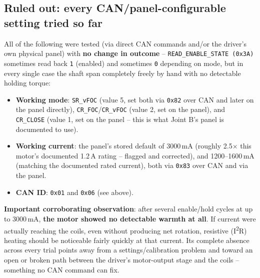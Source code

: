 \documentclass[11pt,letterpaper]{article}
\begin{document}
\subsection{Ruled out: every CAN/panel-configurable setting tried so far}
All of the following were tested (via direct CAN commands and/or the driver's own physical panel) with \textbf{no change in outcome} -- \texttt{READ\_ENABLE\_STATE (0x3A)} sometimes read back \texttt{1} (enabled) and sometimes \texttt{0} depending on mode, but in every single case the shaft span completely freely by hand with no detectable holding torque:
\begin{itemize}
    \item \textbf{Working mode}: \texttt{SR\_vFOC} (value 5, set both via \texttt{0x82} over CAN and later on the panel directly), \texttt{CR\_FOC}/\texttt{CR\_vFOC} (value 2, set on the panel), and \texttt{CR\_CLOSE} (value 1, set on the panel -- this is what Joint B's panel is documented to use).
    \item \textbf{Working current}: the panel's stored default of 3000\,mA (roughly 2.5$\times$ this motor's documented 1.2\,A rating -- flagged and corrected), and 1200--1600\,mA (matching the documented rated current), both via \texttt{0x83} over CAN and via the panel.
    \item \textbf{CAN ID}: \texttt{0x01} and \texttt{0x06} (see above).
\end{itemize}
\textbf{Important corroborating observation}: after several enable/hold cycles at up to 3000\,mA, \textbf{the motor showed no detectable warmth at all}. If current were actually reaching the coils, even without producing net rotation, resistive (I\textsuperscript{2}R) heating should be noticeable fairly quickly at that current. Its complete absence across every trial points away from a settings/calibration problem and toward an open or broken path between the driver's motor-output stage and the coils -- something no CAN command can fix.
\end{document}
